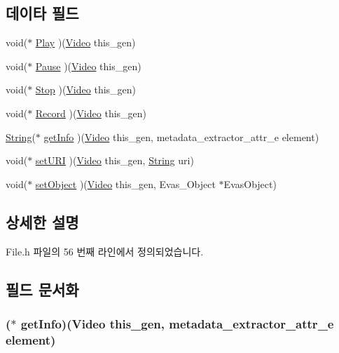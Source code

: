 \subsection*{데이타 필드}
\begin{DoxyCompactItemize}
\item 
void($\ast$ \hyperlink{struct___video_a638d742602c39ab64bbded0f4521d106}{Play} )(\hyperlink{_file_8h_aabe6dc4fa995ed8e3f85097dd589ea6f}{Video} this\-\_\-gen)
\item 
void($\ast$ \hyperlink{struct___video_af1d96a39825d2bb1300661601fd0aa7a}{Pause} )(\hyperlink{_file_8h_aabe6dc4fa995ed8e3f85097dd589ea6f}{Video} this\-\_\-gen)
\item 
void($\ast$ \hyperlink{struct___video_ad9c252b2b06ead2f188d91339e651485}{Stop} )(\hyperlink{_file_8h_aabe6dc4fa995ed8e3f85097dd589ea6f}{Video} this\-\_\-gen)
\item 
void($\ast$ \hyperlink{struct___video_aabb39795a3af7a469d10950d2b088ce6}{Record} )(\hyperlink{_file_8h_aabe6dc4fa995ed8e3f85097dd589ea6f}{Video} this\-\_\-gen)
\item 
\hyperlink{dit_8h_a2efe6d463d80744789f228f5dc4baa39}{String}($\ast$ \hyperlink{struct___video_a28466d9896b523beacac4a1add633aa6}{get\-Info} )(\hyperlink{_file_8h_aabe6dc4fa995ed8e3f85097dd589ea6f}{Video} this\-\_\-gen, metadata\-\_\-extractor\-\_\-attr\-\_\-e element)
\item 
void($\ast$ \hyperlink{struct___video_a1b806abc2d87bcfdb8fc81eeb349062e}{set\-U\-R\-I} )(\hyperlink{_file_8h_aabe6dc4fa995ed8e3f85097dd589ea6f}{Video} this\-\_\-gen, \hyperlink{dit_8h_a2efe6d463d80744789f228f5dc4baa39}{String} uri)
\item 
void($\ast$ \hyperlink{struct___video_a1245c2a3dff66080a4c0f9fd812c25e1}{set\-Object} )(\hyperlink{_file_8h_aabe6dc4fa995ed8e3f85097dd589ea6f}{Video} this\-\_\-gen, Evas\-\_\-\-Object $\ast$Evas\-Object)
\end{DoxyCompactItemize}


\subsection{상세한 설명}


File.\-h 파일의 56 번째 라인에서 정의되었습니다.



\subsection{필드 문서화}
\hypertarget{struct___video_a28466d9896b523beacac4a1add633aa6}{
\subsubsection[{get\-Info}]{($\ast$  get\-Info)({\bf Video} this\-\_\-gen, metadata\-\_\-extractor\-\_\-attr\-\_\-e element)}}\label{struct___video_a28466d9896b523beacac4a1add633aa6}


